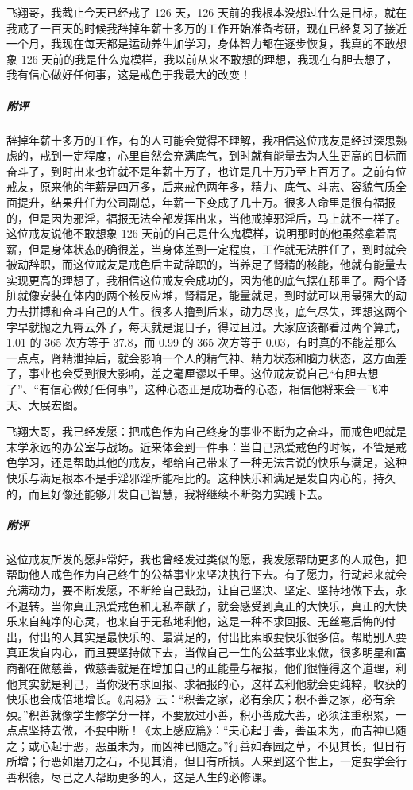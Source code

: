 \begin{case}
    飞翔哥，我截止今天已经戒了 126 天，126 天前的我根本没想过什么是目标，就在我戒了一百天的时候我辞掉年薪十多万的工作开始准备考研，现在已经复习了接近一个月，我现在每天都是运动养生加学习，身体智力都在逐步恢复，我真的不敢想象 126 天前的我是什么鬼模样，我以前从来不敢想的理想，我现在有胆去想了，我有信心做好任何事，这是戒色于我最大的改变！
    \subparagraph{附评} 辞掉年薪十多万的工作，有的人可能会觉得不理解，我相信这位戒友是经过深思熟虑的，戒到一定程度，心里自然会充满底气，到时就有能量去为人生更高的目标而奋斗了，到时出来也许就不是年薪十万了，也许是几十万乃至上百万了。之前有位戒友，原来他的年薪是四万多，后来戒色两年多，精力、底气、斗志、容貌气质全面提升，结果升任为公司副总，年薪一下变成了几十万。很多人命里是很有福报的，但是因为邪淫，福报无法全部发挥出来，当他戒掉邪淫后，马上就不一样了。这位戒友说他不敢想象 126 天前的自己是什么鬼模样，说明那时的他虽然拿着高薪，但是身体状态的确很差，当身体差到一定程度，工作就无法胜任了，到时就会被动辞职，而这位戒友是戒色后主动辞职的，当养足了肾精的核能，他就有能量去实现更高的理想了，我相信这位戒友会成功的，因为他的底气摆在那里了。两个肾脏就像安装在体内的两个核反应堆，肾精足，能量就足，到时就可以用最强大的动力去拼搏和奋斗自己的人生。很多人撸到后来，动力尽丧，底气尽失，理想这两个字早就抛之九霄云外了，每天就是混日子，得过且过。大家应该都看过两个算式，1.01 的 365 次方等于 37.8，而 0.99 的 365 次方等于 0.03，有时真的不能差那么一点点，肾精泄掉后，就会影响一个人的精气神、精力状态和脑力状态，这方面差了，事业也会受到很大影响，差之毫厘谬以千里。这位戒友说自己“有胆去想了”、“有信心做好任何事”，这种心态正是成功者的心态，相信他将来会一飞冲天、大展宏图。
\end{case}

\begin{case}
    飞翔大哥，我已经发愿：把戒色作为自己终身的事业不断为之奋斗，而戒色吧就是末学永远的办公室与战场。近来体会到一件事：当自己热爱戒色的时候，不管是戒色学习，还是帮助其他的戒友，都给自己带来了一种无法言说的快乐与满足，这种快乐与满足根本不是手淫邪淫所能相比的。这种快乐和满足是发自内心的，持久的，而且好像还能够开发自己智慧，我将继续不断努力实践下去。
    \subparagraph{附评} 这位戒友所发的愿非常好，我也曾经发过类似的愿，我发愿帮助更多的人戒色，把帮助他人戒色作为自己终生的公益事业来坚决执行下去。有了愿力，行动起来就会充满动力，要不断发愿，不断给自己鼓劲，让自己坚决、坚定、坚持地做下去，永不退转。当你真正热爱戒色和无私奉献了，就会感受到真正的大快乐，真正的大快乐来自纯净的心灵，也来自于无私地利他，这是一种不求回报、无丝毫后悔的付出，付出的人其实是最快乐的、最满足的，付出比索取要快乐很多倍。帮助别人要真正发自内心，而且要坚持做下去，当做自己一生的公益事业来做，很多明星和富商都在做慈善，做慈善就是在增加自己的正能量与福报，他们很懂得这个道理，利他其实就是利己，当你没有求回报、求福报的心，这样去利他就会更纯粹，收获的快乐也会成倍地增长。《周易》云：“积善之家，必有余庆；积不善之家，必有余殃。”积善就像学生修学分一样，不要放过小善，积小善成大善，必须注重积累，一点点坚持去做，不要中断！《太上感应篇》：“夫心起于善，善虽未为，而吉神已随之；或心起于恶，恶虽未为，而凶神已随之。”行善如春园之草，不见其长，但日有所增；行恶如磨刀之石，不见其消，但日有所损。人来到这个世上，一定要学会行善积德，尽己之人帮助更多的人，这是人生的必修课。
\end{case}

